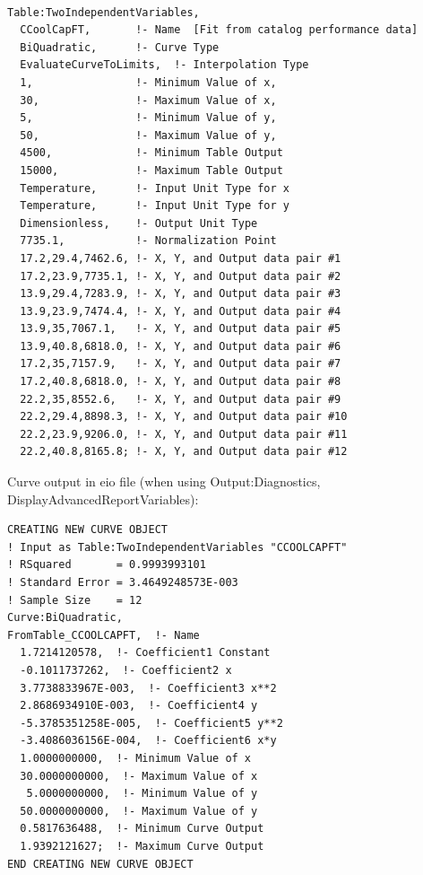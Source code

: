 \begin{lstlisting}

Table:TwoIndependentVariables,
  CCoolCapFT,       !- Name  [Fit from catalog performance data]
  BiQuadratic,      !- Curve Type
  EvaluateCurveToLimits,  !- Interpolation Type
  1,                !- Minimum Value of x,
  30,               !- Maximum Value of x,
  5,                !- Minimum Value of y,
  50,               !- Maximum Value of y,
  4500,             !- Minimum Table Output
  15000,            !- Maximum Table Output
  Temperature,      !- Input Unit Type for x
  Temperature,      !- Input Unit Type for y
  Dimensionless,    !- Output Unit Type
  7735.1,           !- Normalization Point
  17.2,29.4,7462.6, !- X, Y, and Output data pair #1
  17.2,23.9,7735.1, !- X, Y, and Output data pair #2
  13.9,29.4,7283.9, !- X, Y, and Output data pair #3
  13.9,23.9,7474.4, !- X, Y, and Output data pair #4
  13.9,35,7067.1,   !- X, Y, and Output data pair #5
  13.9,40.8,6818.0, !- X, Y, and Output data pair #6
  17.2,35,7157.9,   !- X, Y, and Output data pair #7
  17.2,40.8,6818.0, !- X, Y, and Output data pair #8
  22.2,35,8552.6,   !- X, Y, and Output data pair #9
  22.2,29.4,8898.3, !- X, Y, and Output data pair #10
  22.2,23.9,9206.0, !- X, Y, and Output data pair #11
  22.2,40.8,8165.8; !- X, Y, and Output data pair #12
\end{lstlisting}

Curve output in eio file (when using Output:Diagnostics, DisplayAdvancedReportVariables):

\begin{lstlisting}
CREATING NEW CURVE OBJECT
! Input as Table:TwoIndependentVariables "CCOOLCAPFT"
! RSquared       = 0.9993993101
! Standard Error = 3.4649248573E-003
! Sample Size    = 12
Curve:BiQuadratic,
FromTable_CCOOLCAPFT,  !- Name
  1.7214120578,  !- Coefficient1 Constant
  -0.1011737262,  !- Coefficient2 x
  3.7738833967E-003,  !- Coefficient3 x**2
  2.8686934910E-003,  !- Coefficient4 y
  -5.3785351258E-005,  !- Coefficient5 y**2
  -3.4086036156E-004,  !- Coefficient6 x*y
  1.0000000000,  !- Minimum Value of x
  30.0000000000,  !- Maximum Value of x
   5.0000000000,  !- Minimum Value of y
  50.0000000000,  !- Maximum Value of y
  0.5817636488,  !- Minimum Curve Output
  1.9392121627;  !- Maximum Curve Output
END CREATING NEW CURVE OBJECT
\end{lstlisting}

